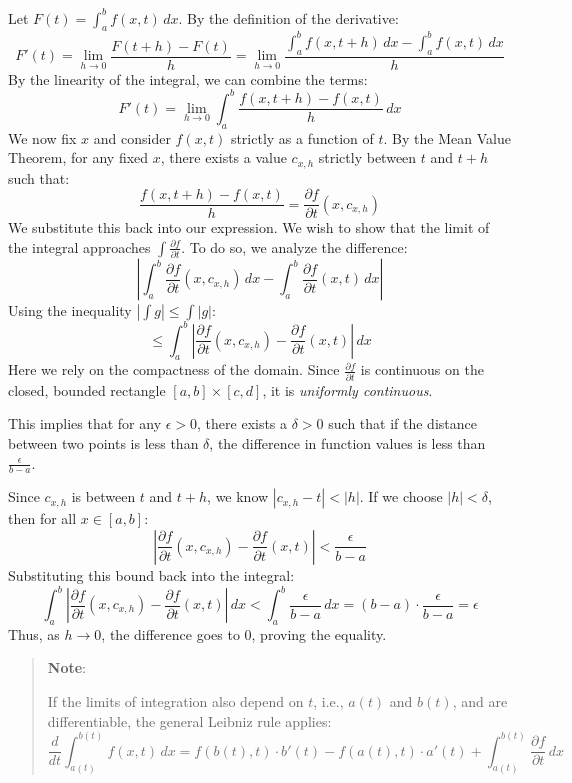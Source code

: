 \documentclass{book}
\newenvironment{note}
 {\begin{tcolorbox}[enhanced, sharp corners, colback=white , borderline={0.2pt}{0pt}{black}]
   \begin{quote}\textbf{Note}:
   }{
   \end{quote}\end{tcolorbox}}
\newenvironment{Proof}[1][]
  {\begin{ProofTcb}[#1]}
  {\end{ProofTcb}}
\begin{document}
\begin{Proof}
    Let $F(t) = \int_{a}^{b} f(x, t) \, dx$. By the definition of the derivative:
    \[
        F'(t) = \lim_{h \to 0} \frac{F(t+h) - F(t)}{h} = \lim_{h \to 0} \frac{\int_{a}^{b} f(x, t+h) \, dx - \int_{a}^{b} f(x, t) \, dx}{h}
    \]
    By the linearity of the integral, we can combine the terms:
    \[
        F'(t) = \lim_{h \to 0} \int_{a}^{b} \frac{f(x, t+h) - f(x, t)}{h} \, dx
    \]
    We now fix $x$ and consider $f(x, t)$ strictly as a function of $t$. By the Mean Value Theorem, for any fixed $x$, there exists a value $c_{x,h}$ strictly between $t$ and $t+h$ such that:
    \[
        \frac{f(x, t+h) - f(x, t)}{h} = \frac{\partial f}{\partial t}(x, c_{x,h})
    \]
    We substitute this back into our expression. We wish to show that the limit of the integral approaches $\int \frac{\partial f}{\partial t}$. To do so, we analyze the difference:
    \[
        \left| \int_{a}^{b} \frac{\partial f}{\partial t}(x, c_{x,h}) \, dx - \int_{a}^{b} \frac{\partial f}{\partial t}(x, t) \, dx \right|
    \]
    Using the inequality $|\int g| \le \int |g|$:
    \[
        \le \int_{a}^{b} \left| \frac{\partial f}{\partial t}(x, c_{x,h}) - \frac{\partial f}{\partial t}(x, t) \right| \, dx
    \]
    Here we rely on the compactness of the domain. Since $\frac{\partial f}{\partial t}$ is continuous on the
    closed, bounded rectangle $[a, b] \times [c, d]$, it is \emph{uniformly continuous}.

    This implies that for any $\epsilon > 0$, there exists a $\delta > 0$ such that if the distance between two points is less than $\delta$, the difference in function values is less than $\frac{\epsilon}{b-a}$.

    Since $c_{x,h}$ is between $t$ and $t+h$, we know $|c_{x,h} - t| < |h|$. If we choose $|h| < \delta$, then for all $x \in [a, b]$:
    \[
        \left| \frac{\partial f}{\partial t}(x, c_{x,h}) - \frac{\partial f}{\partial t}(x, t) \right| < \frac{\epsilon}{b-a}
    \]
    Substituting this bound back into the integral:
    \[
        \int_{a}^{b} \left| \frac{\partial f}{\partial t}(x, c_{x,h}) - \frac{\partial f}{\partial t}(x, t) \right| \, dx < \int_{a}^{b} \frac{\epsilon}{b-a} \, dx = (b-a) \cdot \frac{\epsilon}{b-a} = \epsilon
    \]
    Thus, as $h \to 0$, the difference goes to 0, proving the equality.
\end{Proof}

\begin{note}
    If the limits of integration also depend on $t$, i.e., $a(t)$ and $b(t)$, and are differentiable, the general Leibniz rule applies:
    \[
        \frac{d}{dt} \int_{a(t)}^{b(t)} f(x, t) \, dx = f(b(t), t) \cdot b'(t) - f(a(t), t) \cdot a'(t) + \int_{a(t)}^{b(t)} \frac{\partial f}{\partial t} \, dx
    \]
\end{note}

\newpage
\printindex

\newpage
\printbibliography
\end{document}
